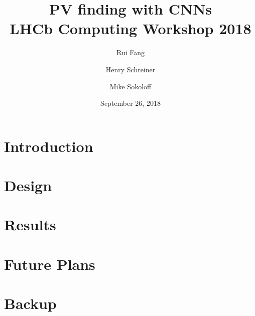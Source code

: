 \documentclass[aspectratio=169, 10pt]{beamer}
\title[PV finding with CNNs: LHCb Computing Workshop 2018]{PV finding with CNNs\\{\small LHCb Computing Workshop 2018}}
\author[Fang, Schreiner, Sokoloff]{Rui Fang \and \underline{Henry Schreiner} \and Mike Sokoloff}
\institute{The University of Cincinnati}
\date{September 26, 2018}
\begin{document}
\begin{frame}
\titlepage
\end{frame}

\section{Introduction}


\section{Design}


\section{Results}


\section{Future Plans}


\backupbegin
\section{Backup}

\backupend
\end{document}
